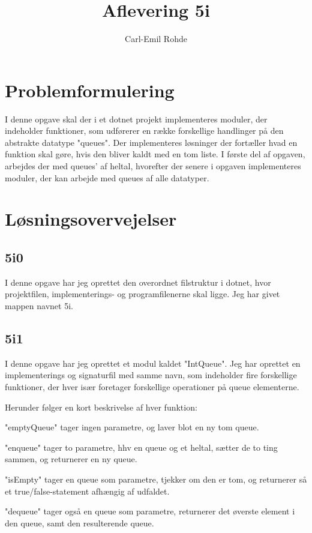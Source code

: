 \documentclass{article}
\title{Aflevering 5i}
\begin{document}
\author{Carl-Emil Rohde }
\maketitle

\section*{Problemformulering}
I denne opgave skal der i et dotnet projekt implementeres moduler, der indeholder funktioner, som udførerer en række forskellige handlinger på den abstrakte datatype "queues". Der implementeres løsninger der fortæller hvad en funktion skal gøre, hvis den bliver kaldt med en tom liste. I første del af opgaven, arbejdes der med queues' af heltal, hvorefter der senere i opgaven implementeres moduler, der kan arbejde med queues af alle datatyper.  


\section*{Løsningsovervejelser}
\subsection*{5i0}
I denne opgave har jeg oprettet den overordnet filstruktur i dotnet, hvor projektfilen, implementerings- og programfilenerne skal ligge. Jeg har givet mappen navnet 5i.  

\subsection*{5i1}
I denne opgave har jeg oprettet et modul kaldet "IntQueue". Jeg har oprettet en implementerings og signaturfil med samme navn, som indeholder fire forskellige funktioner, der hver især foretager forskellige operationer på queue elementerne. 

Herunder følger en kort beskrivelse af hver funktion:

"emptyQueue" tager ingen parametre, og laver blot en ny tom queue. 

"enqueue" tager to parametre, hhv en queue og et heltal, sætter de to ting sammen, og returnerer en ny queue. 

"isEmpty" tager en queue som parametre, tjekker om den er tom, og returnerer så et true/false-statement afhængig af udfaldet. 

"dequeue" tager også en queue som parametre, returnerer det øverste element i den queue, samt den resulterende queue.  
\end{document}
